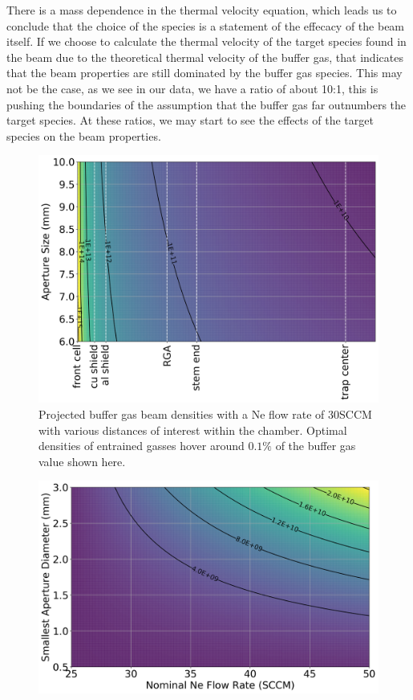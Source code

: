 There is a mass dependence in the thermal velocity equation, which leads us to conclude that the choice of the species is a statement of the effecacy of the beam itself. If we choose to calculate the thermal velocity of the target species found in the beam due to the theoretical thermal velocity of the buffer gas, that indicates that the beam properties are still dominated by the buffer gas species. This may not be the case, as we see in our data, we have a ratio of about 10:1, this is pushing the boundaries of the assumption that the buffer gas far outnumbers the target species. At these ratios, we may start to see the effects of the target species on the beam properties.

\begin{figure}[H]
	\centering
	\includegraphics[width=1\textwidth]{images/CBGB_beam_density_over_system.png}
	\caption{Projected buffer gas beam densities with a Ne flow rate of 30SCCM with various distances of interest within the chamber. Optimal densities of entrained gasses hover around $0.1\%$ of the buffer gas value shown here.}
	\label{fig: beam_density}
\end{figure}

\begin{figure}[H]
	\centering
	\includegraphics[width=1\textwidth]{images/CBGB_trap_density_aperture.png}
	\caption{}
	\label{fig: trap_density}
\end{figure}

